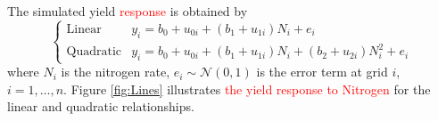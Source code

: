 \documentclass[a4paper]{article} 	%
\newcommand{\N}{\mathcal{N}}
\newcommand{\revision}[1]{\textcolor{red}{#1}}
\begin{document}
The simulated yield \revision{response} is obtained by 
\begin{equation}
\begin{cases}
	\text{Linear}  &y_i = b_0 + u_{0i} + (b_1 + u_{1i})N_i + e_i \\
	\text{Quadratic} &y_i = b_0 + u_{0i} + (b_1 + u_{1i})N_i + (b_2 + u_{2i})N_i^2 + e_i
\end{cases}
\end{equation}
where $N_i$ is the nitrogen rate, $e_i\sim \N(0,1)$ is the error term at grid $i$, $i = 1, \ldots, n$. Figure \ref{fig:Lines} illustrates \revision{the yield response to Nitrogen} for the linear and quadratic relationships.
\end{document}

